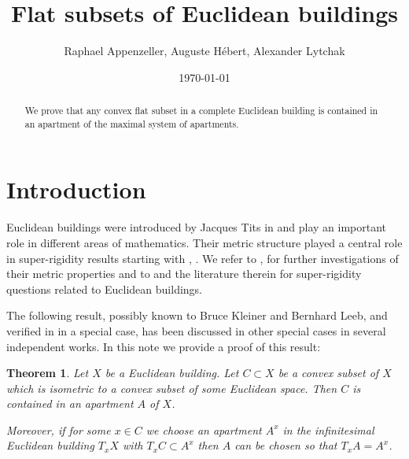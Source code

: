 \documentclass[12pt,leqno]{amsart}
\numberwithin{equation}{section}
\newtheorem{thm}{Theorem}[section]
\theoremstyle{definition}
\theoremstyle{remark}
\begin{document}
\pagebreak
%


\title{Flat subsets of Euclidean buildings}


\author{Raphael Appenzeller,  Auguste H\'ebert, Alexander Lytchak}



\date{\today}  

\begin{abstract}
We prove that any convex flat subset in a complete Euclidean building is contained in an apartment of the maximal system of apartments.
\end{abstract}

\maketitle
\renewcommand{\theequation}{\arabic{section}.\arabic{equation}}




\section{Introduction}
Euclidean buildings were introduced by  Jacques Tits in \cite{Tits} and play an important role in different areas of mathematics.  Their metric structure played a central role in super-rigidity results starting with  \cite{KleinerLeeb1}, \cite{GS}.  We refer to \cite{Linus}, \cite{KLM} for further investigations of their metric properties and to  \cite{BM} and the literature therein for super-rigidity questions related to Euclidean buildings.

The following result, possibly known to Bruce Kleiner and Bernhard Leeb, and  verified  in \cite{KleinerLeeb1} in a special case, has been discussed in other special cases in several independent works. In  this note we provide a proof of this result:



\begin{thm} \label{thm-main}
	Let $X$ be a Euclidean  building.  Let $C\subset X$ be a convex subset of $X$
	which is isometric to a convex subset of some Euclidean space.  Then $C$ is contained in an apartment $A$  of $X$.  
	
	
	Moreover, if for some $x\in C$ we choose an apartment  $A^x$  in the infinitesimal Euclidean building  $T_xX$ with $T_xC\subset A^x$ then $A$ can be chosen so that $T _xA=A^x$. 
\end{thm}
\end{document}

